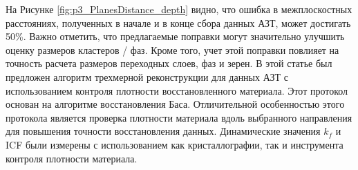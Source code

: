 На Рисунке \cref{fig:p3_PlanesDistance_depth} видно, что ошибка в межплоскостных расстояниях, полученных в начале и в конце сбора данных АЗТ, может достигать 50\%. Важно отметить, что предлагаемые поправки могут значительно улучшить оценку размеров кластеров / фаз. Кроме того, учет этой поправки повлияет на точность расчета размеров переходных слоев, фаз и зерен. 
В этой статье был предложен алгоритм трехмерной реконструкции для данных АЗТ с использованием контроля плотности восстановленного материала. Этот протокол основан на алгоритме восстановления Баса. Отличительной особенностью этого протокола является проверка плотности материала вдоль выбранного направления для повышения точности восстановления данных. Динамические значения $k_f$ и ICF были измерены с использованием как кристаллографии, так и инструмента контроля плотности материала.
















\clearpage
